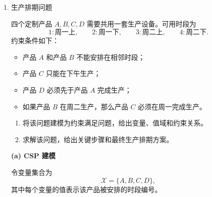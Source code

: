 \documentclass[a4paper]{article}
\begin{document}
\begin{enumerate}
\begin{solution}
约束由题意“交界处观测强度等于相邻两个基站信号中的较大者”直接给出：
\[
\max(A,B)=3,
\]
\[
\max(B,C)=2,
\]
\[
\max(C,D)=2,
\]
\[
\max(D,E)=2,
\]
\[
\max(E,F)=1,
\]
\[
\max(F,A)=3.
\]

\textbf{(b) 求解过程}

由
\[
\max(E,F)=1
\]
可知两个变量都不能超过 1，因此必有
\[
E=1,\qquad F=1.
\]

再由
\[
\max(F,A)=3
\]
且 \(F=1\)，可得
\[
A=3.
\]

由
\[
\max(D,E)=2
\]
且 \(E=1\)，可得
\[
D=2.
\]

由
\[
\max(C,D)=2
\]
且 \(D=2\)，可知
\[
C\in\{1,2\}.
\]

由
\[
\max(B,C)=2
\]
可知 \(B\) 与 \(C\) 都不可能取 3，且二者至少有一个等于 2，因此
\[
B\in\{1,2\},\qquad C\in\{1,2\},\qquad \max(B,C)=2.
\]

最后检查约束
\[
\max(A,B)=3.
\]
由于 \(A=3\)，故无论 \(B=1\) 还是 \(B=2\)，该约束都自动满足。

因此最终可行解不是唯一的，而是共有以下三组：
\[
(A,B,C,D,E,F)=(3,2,1,2,1,1),
\]
\[
(A,B,C,D,E,F)=(3,1,2,2,1,1),
\]
\[
(A,B,C,D,E,F)=(3,2,2,2,1,1).
\]

故该题全部可行解如上。
\end{solution}

\item 生产排期问题

四个定制产品 \(A,B,C,D\) 需要共用一套生产设备。可用时段为
\[
1:\text{周一上},\qquad 2:\text{周一下},\qquad 3:\text{周二上},\qquad 4:\text{周二下}.
\]
约束条件如下：
\begin{itemize}
  \item 产品 \(A\) 和产品 \(B\) 不能安排在相邻时段；
  \item 产品 \(C\) 只能在下午生产；
  \item 产品 \(D\) 必须先于产品 \(A\) 完成生产；
  \item 如果产品 \(B\) 在周二生产，那么产品 \(C\) 必须在周一完成生产。
\end{itemize}

\begin{enumerate}
\item 将该问题建模为约束满足问题，给出变量、值域和约束关系。
\item 求解该问题，给出关键步骤和最终生产排期方案。
\end{enumerate}

\begin{solution}
\textbf{(a) CSP 建模}

令变量集合为
\[
\mathcal X=\{A,B,C,D\},
\]
其中每个变量的值表示该产品被安排的时段编号。


\end{solution}
\end{enumerate}
\end{document}
